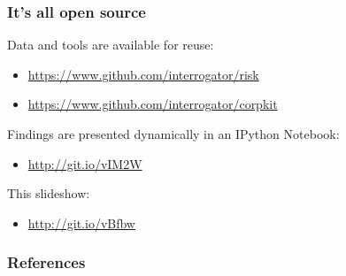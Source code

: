 \documentclass{beamer}       %
\begin{document}
\begin{frame}
    \frametitle{It's all open source}
    Data and tools are available for reuse:
    \begin{itemize}
    \item \url{https://www.github.com/interrogator/risk}
    \item \url{https://www.github.com/interrogator/corpkit}
    \end{itemize}
    Findings are presented dynamically in an IPython Notebook: 
    \begin{itemize}
    \item \url{http://git.io/vIM2W}
    \end{itemize}
    This slideshow:
    \begin{itemize}
    \item \url{http://git.io/vBfbw}
    \end{itemize}
\end{frame}

    \begin{frame}[t,allowframebreaks]
    \frametitle{References}
    
    
    \end{frame}
    
    
\end{document}
